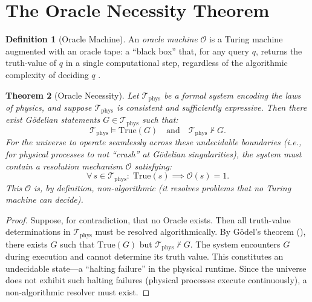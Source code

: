 \documentclass[12pt, a4paper]{article}
\theoremstyle{plain}
\newtheorem{theorem}{Theorem}[section]
\theoremstyle{definition}
\newtheorem{definition}[theorem]{Definition}
\theoremstyle{remark}
\newcommand{\calO}{\mathcal{O}}
\newcommand{\calT}{\mathcal{T}}
\begin{document}
\section{The Oracle Necessity Theorem}\label{sec:oracle}

\begin{definition}[Oracle Machine]\label{def:oracle}
  An \emph{oracle machine} $\calO$ is a Turing machine augmented with an
  oracle tape: a ``black box'' that, for any query $q$, returns the
  truth-value of $q$ in a single computational step, regardless of the
  algorithmic complexity of deciding $q$ \citep{Turing1939}.
\end{definition}

\begin{theorem}[Oracle Necessity]\label{thm:oracle_necessity}
  Let $\calT_{\text{phys}}$ be a formal system encoding the laws of physics,
  and suppose $\calT_{\text{phys}}$ is consistent and sufficiently expressive.
  Then there exist G\"odelian statements $G \in \calT_{\text{phys}}$ such that:
  \begin{equation}
    \calT_{\text{phys}} \models \text{True}(G) \quad \text{and} \quad
    \calT_{\text{phys}} \not\vdash G.
  \end{equation}
  For the universe to operate seamlessly across these undecidable boundaries
  (i.e., for physical processes to not ``crash'' at G\"odelian singularities),
  the system must contain a resolution mechanism $\calO$ satisfying:
  \begin{equation}\label{eq:oracle_completeness}
    \forall\, s \in \calT_{\text{phys}} : \;
    \text{True}(s) \implies \calO(s) = 1.
  \end{equation}
  This $\calO$ is, by definition, non-algorithmic (it resolves problems
  that no Turing machine can decide).
\end{theorem}

\begin{proof}
  Suppose, for contradiction, that no Oracle exists. Then all truth-value
  determinations in $\calT_{\text{phys}}$ must be resolved algorithmically.
  By G\"odel's theorem (), there exists $G$ such that
  $\text{True}(G)$ but $\calT_{\text{phys}} \not\vdash G$. The system
  encounters $G$ during execution and cannot determine its truth value.
  This constitutes an undecidable state---a ``halting failure'' in the
  physical runtime. Since the universe does not exhibit such halting
  failures (physical processes execute continuously), a non-algorithmic
  resolver must exist. \qedhere
\end{proof}
\end{document}
